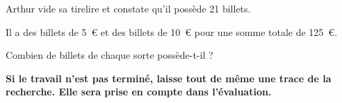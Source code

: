 
\medskip 
Arthur vide sa tirelire et constate qu'il possède 21 billets.
 
Il a des billets de 5~\euro{} et des billets de 10~\euro{} pour une somme totale de 125~\euro.

\medskip
 
Combien de billets de chaque sorte possède-t-il ? 

\medskip

\textbf{Si le travail n'est pas terminé, laisse tout de même une trace de la recherche. Elle sera prise en compte dans l'évaluation.}

\bigskip

